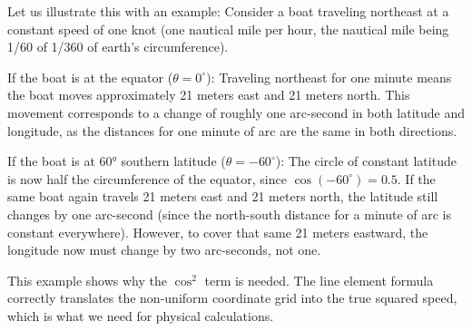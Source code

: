 \documentclass[twocolumn]{article}
\begin{document}
Let us illustrate this with an example: Consider a boat traveling
northeast at a constant speed of one knot (one nautical mile per hour,
the nautical mile being 1/60 of 1/360 of earth's circumference).

If the boat is at the equator (\(\theta = 0^\circ\)): Traveling
northeast for one minute means the boat moves approximately 21 meters
east and 21 meters north. This movement corresponds to a change of
roughly one arc-second in both latitude and longitude, as the distances
for one minute of arc are the same in both directions.

If the boat is at 60° southern latitude (\(\theta = -60^\circ\)): The
circle of constant latitude is now half the circumference of the
equator, since \(\cos(-60^\circ) = 0.5\). If the same boat again
travels 21 meters east and 21 meters north, the latitude still changes
by one arc-second (since the north-south distance for a minute of arc is
constant everywhere). However, to cover that same 21 meters eastward,
the longitude now must change by two arc-seconds, not one.

This example shows why the \(\cos^2\) term is needed. The line element
formula correctly translates the non-uniform coordinate grid into the
true squared speed, which is what we need for physical calculations.
\end{document}
